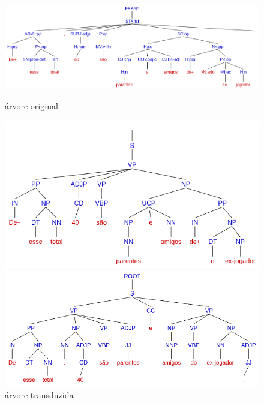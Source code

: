 \begin{figure}[!hb]
    \centering
    \begin{minipage}{.45\textwidth}
        \includegraphics[width=\linewidth]{imagens/ec_bosque_ec_tree_orig.png}
        \caption{árvore original}
    \end{minipage}
    \begin{minipage}{.45\textwidth}
        \includegraphics[width=\linewidth]{imagens/ec_bosque_ec_tree_trans.png}
        \caption{árvore transduzida}
    \end{minipage}
    \begin{minipage}{.45\textwidth}
        \includegraphics[width=\linewidth]{imagens/ec_bosque_ec_tree_ps.png}

\end{minipage}
\end{figure}
